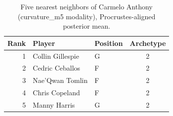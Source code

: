 \begin{table}[htbp]
  \centering\small
  \begin{tabular}{rllc}
    \toprule
    Rank & Player & Position & Archetype \\
    \midrule
    1 & Collin Gillespie & G & 2 \\
    2 & Cedric Ceballos & F & 2 \\
    3 & Nae'Qwan Tomlin & F & 2 \\
    4 & Chris Copeland & F & 2 \\
    5 & Manny Harris & G & 2 \\
    \bottomrule
  \end{tabular}
  \caption{Five nearest neighbors of Carmelo Anthony (curvature_m5 modality), Procrustes-aligned posterior mean.}
  \label{tab:Carmelo_Anthony_neighbors_curvature_m5}
\end{table}

